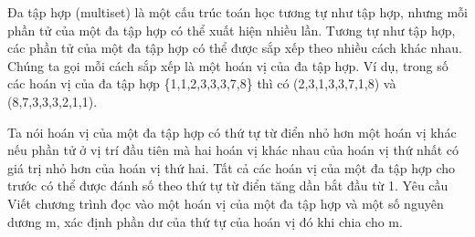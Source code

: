 Đa tập hợp (multiset) là một cấu trúc toán học tương tự như tập hợp, nhưng mỗi phần tử của một đa tập hợp có thể xuất hiện nhiều lần. Tương tự như tập hợp, các phần tử của một đa tập hợp có thể được sắp xếp theo nhiều cách khác nhau. Chúng ta gọi mỗi cách sắp xếp là một hoán vị của đa tập hợp. Ví dụ, trong số các hoán vị của đa tập hợp \{1,1,2,3,3,3,7,8\} thì có (2,3,1,3,3,7,1,8) và (8,7,3,3,3,2,1,1).  

   Ta nói hoán vị của một đa tập hợp có thứ tự từ điển nhỏ hơn một hoán vị khác nếu phần tử ở vị trí đầu tiên mà hai hoán vị khác nhau của hoán vị thứ nhất có giá trị nhỏ hơn của hoán vị thứ hai. Tất cả các hoán vị của một đa tập hợp cho trước có thể được đánh số theo thứ tự từ điển tăng dần bắt đầu từ 1.
   Yêu cầu  
Viết chương trình đọc vào một hoán vị của một đa tập hợp và một số nguyên dương m, xác định phần dư của thứ tự của hoán vị đó khi chia cho m.